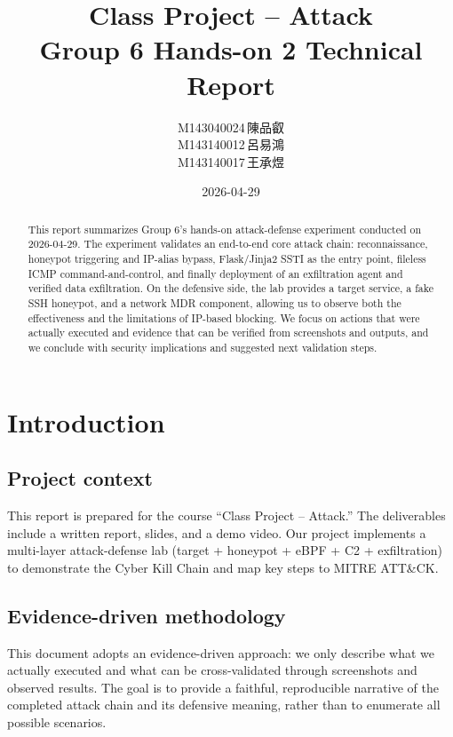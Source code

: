\documentclass[11pt]{article}
\title{Class Project -- Attack\\\large Group 6 Hands-on 2 Technical Report}
\author{M143040024\,陳品叡\\M143140012\,呂易鴻 \\M143140017\,王承煜}
\date{2026-04-29}
\begin{document}
\maketitle

\begin{abstract}
This report summarizes Group 6's hands-on attack-defense experiment conducted on 2026-04-29. The experiment validates an end-to-end core attack chain: reconnaissance, honeypot triggering and IP-alias bypass, Flask/Jinja2 SSTI as the entry point, fileless ICMP command-and-control, and finally deployment of an exfiltration agent and verified data exfiltration. On the defensive side, the lab provides a target service, a fake SSH honeypot, and a network MDR component, allowing us to observe both the effectiveness and the limitations of IP-based blocking. We focus on actions that were actually executed and evidence that can be verified from screenshots and outputs, and we conclude with security implications and suggested next validation steps.
\end{abstract}

\tableofcontents
\newpage

\section{Introduction}

\subsection{Project context}
This report is prepared for the course ``Class Project -- Attack.'' The deliverables include a written report, slides, and a demo video. Our project implements a multi-layer attack-defense lab (target + honeypot + eBPF + C2 + exfiltration) to demonstrate the Cyber Kill Chain and map key steps to MITRE ATT\&CK.

\subsection{Evidence-driven methodology}
This document adopts an evidence-driven approach: we only describe what we actually executed and what can be cross-validated through screenshots and observed results. The goal is to provide a faithful, reproducible narrative of the completed attack chain and its defensive meaning, rather than to enumerate all possible scenarios.
\end{document}
